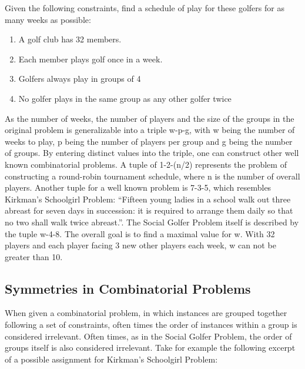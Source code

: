 \documentclass[a4paper]{scrartcl}
\begin{document}
\begin{mdframed}[skipabove=\baselineskip, skipbelow=\baselineskip, leftmargin=20, rightmargin=20]

Given the following constraints, find a schedule of play for these golfers for as many weeks as possible:

\begin{enumerate}
    \item A golf club has 32 members.
    \item Each member plays golf once in a week.
    \item Golfers always play in groups of 4
    \item No golfer plays in the same group as any other golfer twice
\end{enumerate}

\end{mdframed}

As the number of weeks, the number of players and the size of the groups in the original problem is generalizable into a triple w-p-g, with w being the number of weeks to play, p being the number of players per group and g being the number of groups. By entering distinct values into the triple, one can construct other well known combinatorial problems. A tuple of 1-2-(n/2) represents the problem of constructing a round-robin tournament schedule, where n is the number of overall players. Another tuple for a well known problem is 7-3-5, which resembles Kirkman's Schoolgirl Problem: ``Fifteen young ladies in a school walk out three abreast for seven days in succession: it is required to arrange them daily so that no two shall walk twice abreast.''. The Social Golfer Problem itself is described by the tuple w-4-8. The overall goal is to find a maximal value for w. With 32 players and each player facing 3 new other players each week, w can not be greater than 10.


\subsection{Symmetries in Combinatorial Problems}

When given a combinatorial problem, in which instances are grouped together following a set of constraints, often times the order of instances within a group is considered irrelevant. Often times, as in the Social Golfer Problem, the order of groups itself is also considered irrelevant. Take for example the following excerpt of a possible assignment for Kirkman's Schoolgirl Problem:
\end{document}
